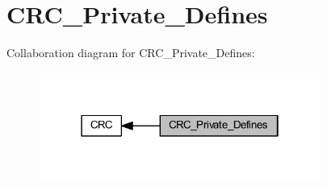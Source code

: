 \hypertarget{group___c_r_c___private___defines}{}\section{C\+R\+C\+\_\+\+Private\+\_\+\+Defines}
\label{group___c_r_c___private___defines}
Collaboration diagram for C\+R\+C\+\_\+\+Private\+\_\+\+Defines\+:
\nopagebreak
\begin{figure}[H]
\begin{center}
\leavevmode
\includegraphics[width=262pt]{group___c_r_c___private___defines}
\end{center}
\end{figure}
